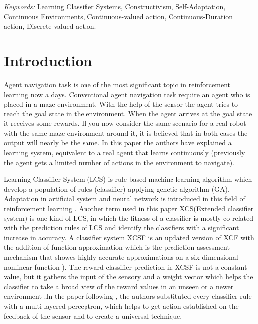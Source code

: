 \documentclass[12pt]{article}
\begin{document}
\noindent%
{\it Keywords:} Learning Classifier Systems, Constructivism, Self-Adaptation, Continuous Environments, Continuous-valued action, Continuous-Duration action, Discrete-valued action.
\vfill

\newpage
\spacingset{} %
\section{Introduction}
\label{sec:intro}

Agent navigation task is one of the most significant topic in reinforcement learning now a days. Conventional agent navigation task require an agent who is placed in a maze environment. With the help of the sensor the agent tries to reach the goal state in the environment. When the agent arrives at the goal state it receives some rewards. If you now consider the same scenario for a real robot with the same maze environment around it, it is believed that in both cases the output will nearly be the same. In this paper the authors have explained a learning system, equivalent to a real agent that learns continuously (previously the agent gets a limited number of actions in the environment to navigate).

Learning Classifier System (LCS) \cite{WilsonPrediction2001FunctionAW} is rule based machine learning algorithm which develop a population of rules (classifier) applying genetic algorithm (GA). Adaptation in artificial system and neural network is introduced in this field of reinforcement learning . Another term used in this paper XCS(Extended classifier system) is one kind of LCS, in which the fitness of a classifier is mostly co-related with the prediction rules of LCS and identify the classifiers with a significant increase in accuracy. A classifier system XCSF is an updated version of XCF with the addition of function approximation which is the prediction assessment mechanism that showes highly accurate approximations on a six-dimensional nonlinear function  \cite{WilsonPrediction2001FunctionAW}). The reward-classifier prediction in XCSF is not a constant value, but it gathers the input of the sensory and a weight vector which helps the classifier to take a broad view of the reward values in an unseen or a newer environment \cite{WilsonPrediction2001FunctionAW}.In the paper following \cite{10.1007/3-540-45712-7_54}, the authors substituted every classifier rule with a multi-layered perceptron, which helps to get action established on the feedback of the sensor and to create a universal technique. 
\end{document}
